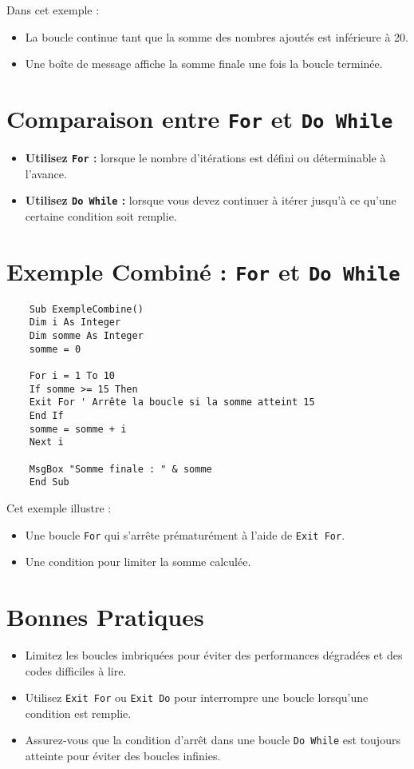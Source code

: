 \documentclass[a4paper,12pt]{report}
\begin{document}
Dans cet exemple :
\begin{itemize}
	\item La boucle continue tant que la somme des nombres ajoutés est inférieure à 20.
	\item Une boîte de message affiche la somme finale une fois la boucle terminée.
\end{itemize}

\section{Comparaison entre \texttt{For} et \texttt{Do While}}
\begin{itemize}
	\item \textbf{Utilisez \texttt{For} :} lorsque le nombre d'itérations est défini ou déterminable à l'avance.
	\item \textbf{Utilisez \texttt{Do While} :} lorsque vous devez continuer à itérer jusqu'à ce qu'une certaine condition soit remplie.
\end{itemize}
\newpage
\section{Exemple Combiné : \texttt{For} et \texttt{Do While}}
\begin{lstlisting}
	Sub ExempleCombine()
	Dim i As Integer
	Dim somme As Integer
	somme = 0
	
	For i = 1 To 10
	If somme >= 15 Then
	Exit For ' Arrête la boucle si la somme atteint 15
	End If
	somme = somme + i
	Next i
	
	MsgBox "Somme finale : " & somme
	End Sub
\end{lstlisting}

Cet exemple illustre :
\begin{itemize}
	\item Une boucle \texttt{For} qui s'arrête prématurément à l'aide de \texttt{Exit For}.
	\item Une condition pour limiter la somme calculée.
\end{itemize}

\section{Bonnes Pratiques}
\begin{itemize}
	\item Limitez les boucles imbriquées pour éviter des performances dégradées et des codes difficiles à lire.
	\item Utilisez \texttt{Exit For} ou \texttt{Exit Do} pour interrompre une boucle lorsqu'une condition est remplie.
	\item Assurez-vous que la condition d'arrêt dans une boucle \texttt{Do While} est toujours atteinte pour éviter des boucles infinies.
\end{itemize}
\end{document}
